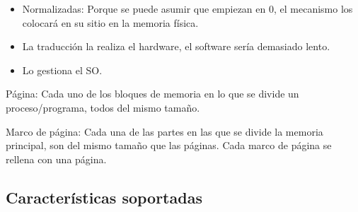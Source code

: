 \documentclass[12pt, twoside, openright]{report} %
\begin{document}
  \begin{itemize}    
  \item
    Normalizadas: Porque se puede asumir que empiezan en 0, el mecanismo
    los colocará en su sitio en la memoria física.
    
    \item
      La traducción la realiza el hardware, el software sería demasiado
      lento.
    \item
      Lo gestiona el SO.
  \end{itemize}

  Página: Cada uno de los bloques de memoria en lo que se divide un
    proceso/programa, todos del mismo tamaño.

    Marco de página: Cada una de las partes en las que se divide la
    memoria principal, son del mismo tamaño que las páginas. Cada marco
    de página se rellena con una página.

    \subsection{Características soportadas}
\end{document}
